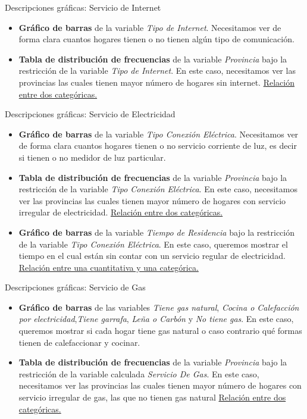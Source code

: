 \documentclass[UTF8]{beamer}
\begin{document}
\begin{frame}{Descripciones gráficas: Servicio de Internet}
\begin{itemize}
    \item \textbf{Gráfico de barras} de la variable \textit{Tipo de Internet}. Necesitamos ver de forma clara cuantos hogares tienen o no tienen algún tipo de comunicación.
    \item \textbf{Tabla de distribución de frecuencias} de la variable \textit{Provincia} bajo la restricción de la variable \textit{Tipo de Internet}. En este caso, necesitamos ver las provincias las cuales tienen mayor número de hogares sin internet.
    \underline{Relación entre dos categóricas.}
\end{itemize}

\end{frame}
\begin{frame}{Descripciones gráficas: Servicio de Electricidad}
\begin{itemize}
    \item \textbf{Gráfico de barras} de la variable \textit{Tipo Conexión Eléctrica}. Necesitamos ver de forma clara cuantos hogares tienen o no servicio corriente de luz, es decir si tienen o no medidor de luz particular.
    \item \textbf{Tabla de distribución de frecuencias} de la variable \textit{Provincia} bajo la restricción de la variable \textit{Tipo Conexión Eléctrica}. En este caso, necesitamos ver las provincias las cuales tienen mayor número de hogares con servicio irregular de electricidad.
   \underline{Relación entre dos categóricas.}
   \item \textbf{Gráfico de barras} de la variable \textit{Tiempo de Residencia} bajo la restricción de la variable \textit{Tipo Conexión Eléctrica}. En este caso, queremos mostrar el tiempo en el cual están sin contar con un servicio regular de electricidad.
   \underline{Relación entre una cuantitativa y una categórica.}

\end{itemize}

\end{frame}

\begin{frame}{Descripciones gráficas: Servicio de Gas}
\begin{itemize}
   \item \textbf{Gráfico de barras} de las variables \textit{Tiene gas natural}, \textit{Cocina o Calefacción por electricidad},\textit{Tiene garrafa}, \textit{Leña o Carbón} y \textit{No tiene gas}. En este caso, queremos mostrar si cada hogar tiene gas natural o caso contrario qué formas tienen de calefaccionar y cocinar.
    \item \textbf{Tabla de distribución de frecuencias} de la variable \textit{Provincia} bajo la restricción de la variable calculada \textit{Servicio De Gas}. En este caso, necesitamos ver las provincias las cuales tienen mayor número de hogares con servicio irregular de gas, las que no tienen gas natural
   \underline{Relación entre dos categóricas.}

\end{itemize}

\end{frame}
\end{document}
